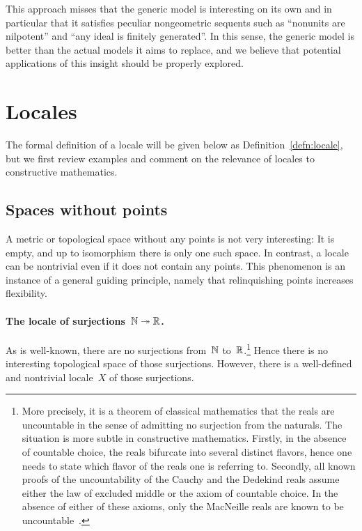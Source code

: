 \documentclass{ws-rv9x6}
\begin{document}
{{This approach misses that the generic model is interesting on its own and in
particular that it satisfies peculiar nongeometric sequents such as ``nonunits
are nilpotent'' and ``any ideal is \notnot finitely generated''. In this sense,
the generic model is better than the actual models it aims to replace, and we
believe that potential applications of this insight should be properly
explored.}


\section{Locales}
\label{sect:locales}

The formal definition of a locale will be given below as
Definition~\ref{defn:locale}, but we first review examples and comment on
the relevance of locales to constructive mathematics.

\subsection{Spaces without points}
\label{sect:examples-no-points}

A metric or topological space without any points is not very interesting: It is
empty, and up to isomorphism there is only one such space. In contrast, a
locale can be nontrivial even if it does not contain any points. This
phenomenon is an instance of a general guiding principle, namely that relinquishing
points increases flexibility.

\paragraph{The locale of surjections~$\mathbb{N} \twoheadrightarrow \mathbb{R}$.} As is
well-known, there are no surjections from~$\mathbb{N}$ to~$\mathbb{R}$.\footnote{More
precisely, it is a theorem of classical mathematics that the reals are
uncountable in the sense of admitting no surjection from the naturals. The
situation is more subtle in constructive mathematics. Firstly, in the absence
of countable choice, the reals bifurcate into several distinct flavors, hence
one needs to state which flavor of the reals one is referring to. Secondly, all
known proofs of the uncountability of the Cauchy and the Dedekind reals assume
either the law of excluded middle or the axiom of countable choice. In the
absence of either of these axioms, only the MacNeille reals are known to be
uncountable~\cite{blechschmidt-hutzler:macneille}.} Hence there is no
interesting topological space of those surjections. However, there is a
well-defined and nontrivial locale~$X$ of those surjections.

}
\end{document}
